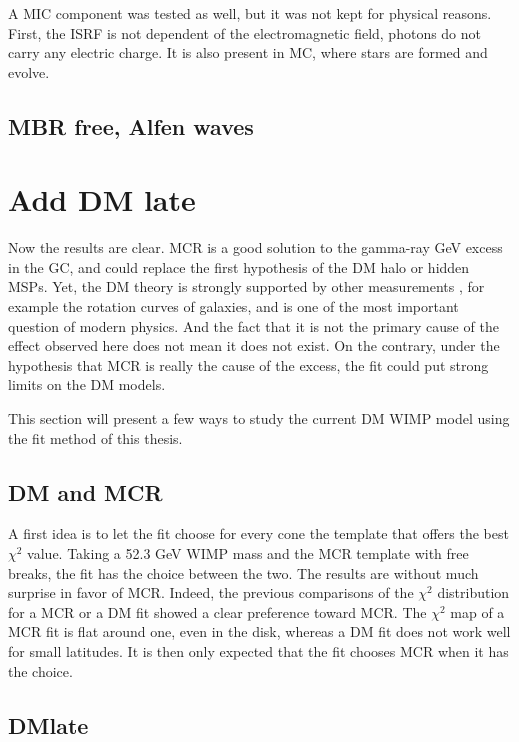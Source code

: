 A MIC component was tested as well, but it was not kept for physical reasons. First, the ISRF is not dependent of the electromagnetic field, photons do not carry any electric charge. It is also present in MC, where stars are formed and evolve.

\subsection{MBR free, Alfen waves}





\section{Add DM late}


Now the results are clear. MCR is a good solution to the gamma-ray GeV excess in the GC, and could replace the first hypothesis of the DM halo or hidden MSPs. Yet, the DM theory is strongly supported by other measurements , for example the rotation curves of galaxies, and is one of the most important question of modern physics. And the fact that it is not the primary cause of the effect observed here does not mean it does not exist. On the contrary, under the hypothesis that MCR is really the cause of the excess, the fit could put strong limits on the DM models.

This section will present a few ways to study the current DM WIMP model using the fit method of this thesis.

\subsection{DM and MCR}

A first idea is to let the fit choose for every cone the template that offers the best $\chi^2$ value. Taking a 52.3 GeV WIMP mass and the MCR template with free breaks, the fit has the choice between the two. The results are without much surprise in favor of MCR. Indeed, the previous comparisons of the $\chi^2$ distribution for a MCR or a DM fit showed a clear preference toward MCR. The $\chi^2$ map of a MCR fit is flat around one, even in the disk, whereas a DM fit does not work well for small latitudes. It is then only expected that the fit chooses MCR when it has the choice.

\subsection{DMlate}


